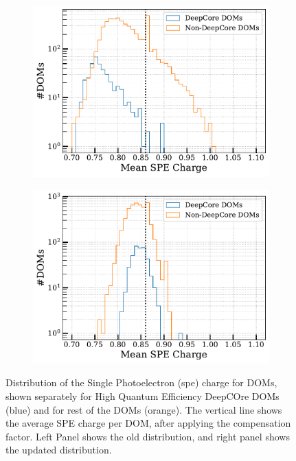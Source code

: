 \begin{figure}[h!]
    \begin{subfigure}[h]{0.7\textwidth}
        \includegraphics{./figures/results/Old.pdf}
    \end{subfigure}
    \hfill
    \begin{subfigure}[h]{0.7\textwidth}
        \includegraphics{./figures/results/simulation.pdf}
    \end{subfigure}
    
    \caption[Distribution of the Single Photoelectron (spe) charge for DOMs in data files]{Distribution of the Single Photoelectron (spe) charge for DOMs, shown separately for High Quantum Efficiency DeepCOre DOMs (blue) and for rest of the DOMs (orange). The vertical line shows the average SPE charge per DOM, after applying the compensation factor. Left Panel shows the old distribution, and right panel shows the updated distribution.}
\end{figure}


